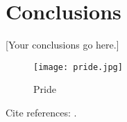 \chapter*{Conclusions}
\label{ch:conclusion}

[Your conclusions go here.]

\begin{figure}[h]
    \centering
    \texttt{[image: pride.jpg]}
    \caption{Pride}
    \label{fig:jhu_pride}
\end{figure}

Cite references: \cite{example2025, examplebook2024, exampleconf2023}. 